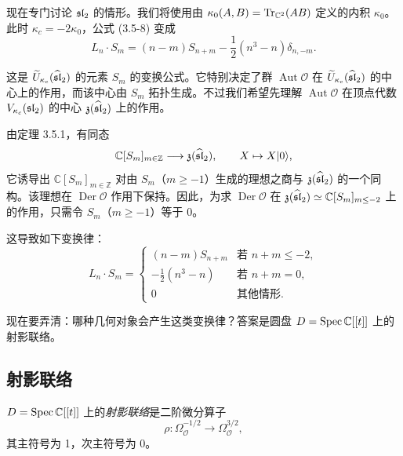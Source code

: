 现在专门讨论 $\mathfrak{sl}_2$ 的情形。我们将使用由 $\kappa_0(A,B)=\operatorname{Tr}_{\mathbb{C}^2}(AB)$ 定义的内积 $\kappa_0$。此时 $\kappa_c=-2\kappa_0$，公式 (3.5-8) 变成
\[
    L_n\cdot S_m=(n-m)S_{n+m}-\frac12(n^3-n)\delta_{n,-m}.
\]

这是 $\widetilde{U}_{\kappa_c}(\widehat{\mathfrak{sl}}_2)$ 的元素 $S_m$ 的变换公式。它特别决定了群 $\operatorname{Aut}\mathcal{O}$ 在 $\widetilde{U}_{\kappa_c}(\widehat{\mathfrak{sl}}_2)$ 的中心上的作用，而该中心由 $S_m$ 拓扑生成。不过我们希望先理解 $\operatorname{Aut}\mathcal{O}$ 在顶点代数 $V_{\kappa_c}(\mathfrak{sl}_2)$ 的中心 $\mathfrak{z}(\widehat{\mathfrak{sl}}_2)$ 上的作用。

由定理 3.5.1，有同态
\[
    \mathbb{C}[S_m]_{m\in\mathbb{Z}}\longrightarrow\mathfrak{z}(\widehat{\mathfrak{sl}}_2),
    \qquad X\mapsto X|0\rangle,
\]
它诱导出 $\mathbb{C}[S_m]_{m\in\mathbb{Z}}$ 对由 $S_m$（$m\ge -1$）生成的理想之商与 $\mathfrak{z}(\widehat{\mathfrak{sl}}_2)$ 的一个同构。该理想在 $\operatorname{Der}\mathcal{O}$ 作用下保持。因此，为求 $\operatorname{Der}\mathcal{O}$ 在 $\mathfrak{z}(\widehat{\mathfrak{sl}}_2)\simeq\mathbb{C}[S_m]_{m\le-2}$ 上的作用，只需令 $S_m$（$m\ge -1$）等于 0。

这导致如下变换律：
\begin{equation}
    L_n\cdot S_m=
    \begin{cases}
        (n-m)S_{n+m} & \text{若 } n+m\le -2,\\
        -\frac12(n^3-n) & \text{若 } n+m=0,\\
        0 & \text{其他情形}.
    \end{cases}
    \tag{3.5-9}
\end{equation}


现在要弄清：哪种几何对象会产生这类变换律？答案是圆盘 $D=\operatorname{Spec}\mathbb{C}[[t]]$ 上的射影联络。

\subsection{射影联络}

$D=\operatorname{Spec}\mathbb{C}[[t]]$ 上的\emph{射影联络}是二阶微分算子
\begin{equation}
    \rho:\Omega^{-1/2}_{\mathcal{O}}\longrightarrow\Omega^{3/2}_{\mathcal{O}},
    \tag{3.5-10}
\end{equation}
其主符号为 1，次主符号为 0。

